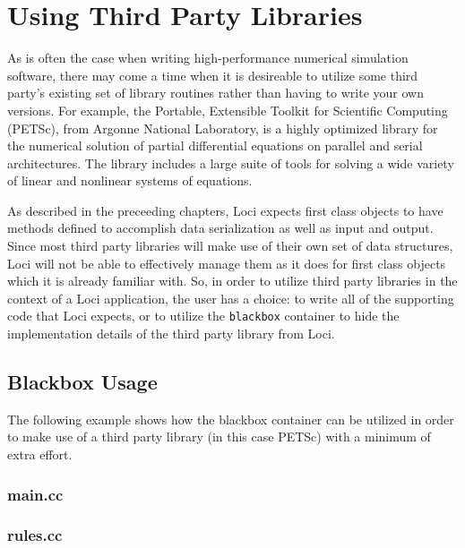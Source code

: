 \chapter{Using Third Party Libraries}

As is often the case when writing high-performance numerical simulation
software, there may come a time when it is desireable to utilize some third
party's existing set of library routines rather than having to write your
own versions.  For example, the Portable, Extensible Toolkit for Scientific
Computing (PETSc), from Argonne National Laboratory, is a highly optimized
library for the numerical solution of partial differential equations on
parallel and serial architectures.  The library includes a large suite of
tools for solving a wide variety of linear and nonlinear systems of
equations.

As described in the preceeding chapters, Loci expects first class objects
to have methods defined to accomplish data serialization as well as input
and output.  Since most third party libraries will make use of their own
set of data structures, Loci will not be able to effectively manage them
as it does for first class objects which it is already familiar with.  So,
in order to utilize third party libraries in the context of a Loci
application, the user has a choice:  to write all of the supporting code
that Loci expects, or to utilize the {\tt blackbox} container to hide the
implementation details of the third party library from Loci.

\section{Blackbox Usage}
The following example shows how the blackbox container can be utilized
in order to make use of a third party library (in this case PETSc) with a
minimum of extra effort.

\subsection*{main.cc}


\subsection*{rules.cc}

